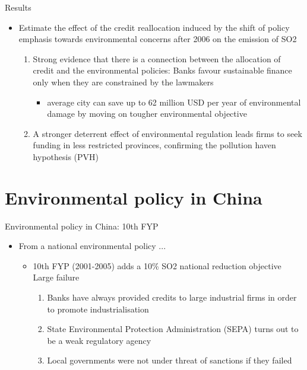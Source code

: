 \documentclass{beamer}
\begin{document}
\begin{frame}{Results}
    \begin{itemize}
        \item Estimate the effect of the credit reallocation induced by the shift of policy emphasis towards environmental concerns after 2006 on the emission of SO2
        \begin{enumerate}
            \item Strong evidence that there is a connection between the allocation of credit and the environmental policies: Banks favour sustainable finance only when they are constrained by the lawmakers
            \begin{itemize}
                \item   average city can save up to 62 million USD per year of environmental damage by moving on tougher environmental objective
            \end{itemize}
             \item A stronger deterrent effect of environmental regulation leads firms to seek funding in less restricted provinces, confirming the pollution haven hypothesis (PVH)
        \end{enumerate}
    \end{itemize}
\end{frame}

\section{Environmental policy in China}

\begin{frame}{Environmental policy in China: 10th FYP}
    \begin{itemize}
        \item  From a national environmental policy ...
        \begin{itemize}
            \item   10th FYP (2001-2005) adds a 10\% SO2 national reduction objective \textrightarrow Large failure
            \begin{enumerate}
                \item Banks have always provided credits to large industrial firms in order to promote industrialisation
                \item State Environmental Protection Administration (SEPA) turns out to be a weak regulatory agency
                \item Local governments were not under threat of sanctions if they failed
            \end{enumerate}
        \end{itemize}
    \end{itemize}
\end{frame}
\end{document}
